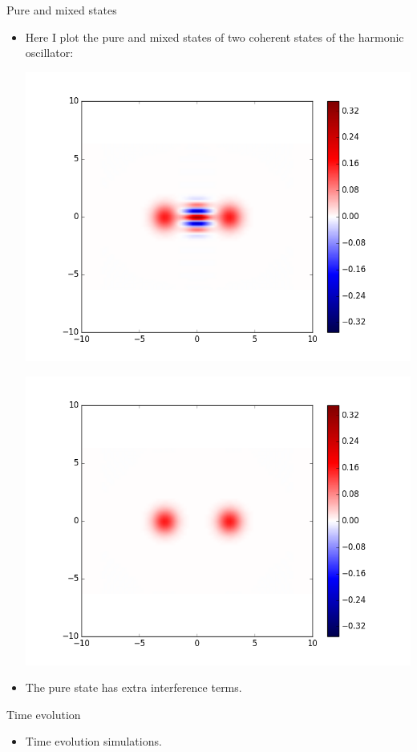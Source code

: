 \documentclass{beamer}
\begin{document}
\begin{frame}{Pure and mixed states}
	\begin{itemize}
		\vfill
		\item Here I plot the pure and mixed states of two coherent states of the harmonic oscillator:\\
		\begin{minipage}[t][][b]{0.49\linewidth}
			\centering
			\vspace*{-5pt}
			\includegraphics[width=1\linewidth]{oscPure}
		\end{minipage}
		\begin{minipage}[t][][b]{0.49\linewidth}
			\centering
			\vspace*{-5pt}
			\includegraphics[width=1\linewidth]{oscMixed}
		\end{minipage}
		\vfill
		\item The pure state has extra interference terms.
		\vfill
	\end{itemize}
\end{frame}

\begin{frame}{Time evolution}
	\begin{itemize}
		\vfill
		\item Time evolution simulations.
		\vfill
	\end{itemize}
\end{frame}

	
\end{document}
